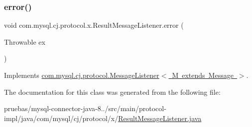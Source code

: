 \mbox{\label{classcom_1_1mysql_1_1cj_1_1protocol_1_1x_1_1_result_message_listener_ad8c3856e573b2bcad94f5b914e5f9c82}} 
\subsubsection{\texorpdfstring{error()}{error()}}
{\footnotesize\ttfamily void com.\+mysql.\+cj.\+protocol.\+x.\+Result\+Message\+Listener.\+error (\begin{DoxyParamCaption}\item[{Throwable}]{ex }\end{DoxyParamCaption})}



Implements \mbox{\hyperlink{interfacecom_1_1mysql_1_1cj_1_1protocol_1_1_message_listener_a9e06f02beaf29eb065149ac4f819761f}{com.\+mysql.\+cj.\+protocol.\+Message\+Listener$<$ M extends Message $>$}}.



The documentation for this class was generated from the following file\+:\begin{DoxyCompactItemize}
\item 
pruebas/mysql-\/connector-\/java-\/8../src/main/protocol-\/impl/java/com/mysql/cj/protocol/x/\mbox{\hyperlink{_result_message_listener_8java}{Result\+Message\+Listener.\+java}}\end{DoxyCompactItemize}
